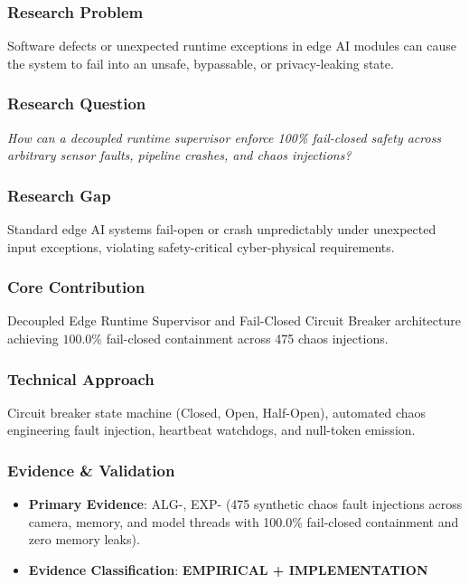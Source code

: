 \documentclass[11pt,letterpaper]{article}
\begin{document}
\subsubsection{Research Problem}
Software defects or unexpected runtime exceptions in edge AI modules can cause the system to fail into an unsafe, bypassable, or privacy-\allowbreak leaking state.

\subsubsection{Research Question}
\begin{tcolorbox}[colback=blue!3!white,colframe=blue!50!black,title=Primary Scientific Question]
\textit{How can a decoupled runtime supervisor enforce 100\% fail-\allowbreak closed safety across arbitrary sensor faults, pipeline crashes, and chaos injections?}
\end{tcolorbox}

\subsubsection{Research Gap}
Standard edge AI systems fail-\allowbreak open or crash unpredictably under unexpected input exceptions, violating safety-\allowbreak critical cyber-\allowbreak physical requirements.

\subsubsection{Core Contribution}
Decoupled Edge Runtime Supervisor and Fail-\allowbreak Closed Circuit Breaker architecture achieving $100.0\%$ fail-\allowbreak closed containment across 475 chaos injections.

\subsubsection{Technical Approach}
Circuit breaker state machine (Closed, Open, Half-\allowbreak Open), automated chaos engineering fault injection, heartbeat watchdogs, and null-\allowbreak token emission.

\subsubsection{Evidence \& Validation}
\begin{itemize}[leftmargin=*]
    \item \textbf{Primary Evidence}: ALG-, EXP- (475 synthetic chaos fault injections across camera, memory, and model threads with 100.0\% fail-\allowbreak closed containment and zero memory leaks).
    \item \textbf{Evidence Classification}: \textbf{EMPIRICAL + IMPLEMENTATION}
\end{itemize}
\end{document}
